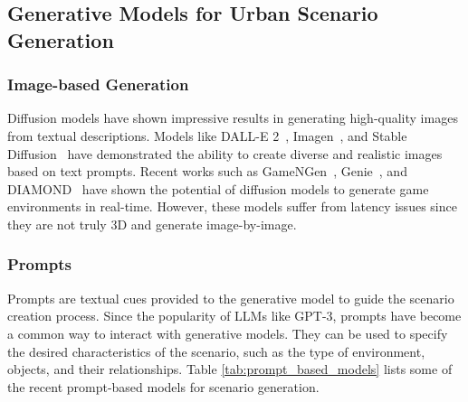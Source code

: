 \documentclass{article}
\begin{document}
\subsection{Generative Models for Urban Scenario Generation}

\subsubsection{Image-based Generation}

Diffusion models have shown impressive results in generating high-quality images from textual descriptions. Models like DALL-E 2~\cite{ramesh2022hierarchical}, Imagen~\cite{saharia2022photorealistic}, and Stable Diffusion~\cite{rombach2022high} have demonstrated the ability to create diverse and realistic images based on text prompts. Recent works such as GameNGen~\cite{valevski2024diffusion}, Genie~\cite{bruce2024genie}, and DIAMOND~\cite{alonso2024diffusion} have shown the potential of diffusion models to generate game environments in real-time. However, these models suffer from latency issues since they are not truly 3D and generate image-by-image.


\subsubsection{Prompts}

Prompts are textual cues provided to the generative model to guide the scenario creation process. Since the popularity of LLMs like GPT-3, prompts have become a common way to interact with generative models. They can be used to specify the desired characteristics of the scenario, such as the type of environment, objects, and their relationships. Table \ref{tab:prompt_based_models} lists some of the recent prompt-based models for scenario generation.
\end{document}

